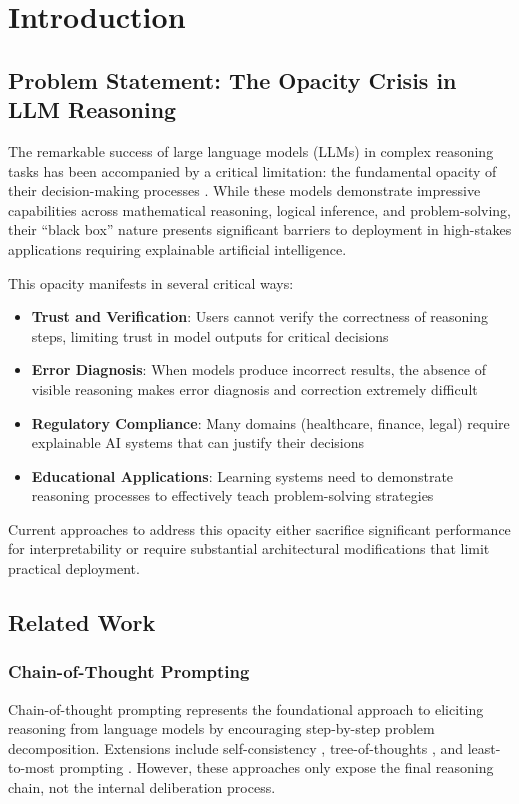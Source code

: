 \section{Introduction}
\label{sec:introduction}

\subsection{Problem Statement: The Opacity Crisis in LLM Reasoning}

The remarkable success of large language models (LLMs) in complex reasoning tasks has been accompanied by a critical limitation: the fundamental opacity of their decision-making processes \cite{brown2020language,openai2023gpt4}. While these models demonstrate impressive capabilities across mathematical reasoning, logical inference, and problem-solving, their ``black box'' nature presents significant barriers to deployment in high-stakes applications requiring explainable artificial intelligence.

This opacity manifests in several critical ways:
\begin{itemize}
    \item \textbf{Trust and Verification}: Users cannot verify the correctness of reasoning steps, limiting trust in model outputs for critical decisions
    \item \textbf{Error Diagnosis}: When models produce incorrect results, the absence of visible reasoning makes error diagnosis and correction extremely difficult
    \item \textbf{Regulatory Compliance}: Many domains (healthcare, finance, legal) require explainable AI systems that can justify their decisions
    \item \textbf{Educational Applications}: Learning systems need to demonstrate reasoning processes to effectively teach problem-solving strategies
\end{itemize}

Current approaches to address this opacity either sacrifice significant performance for interpretability or require substantial architectural modifications that limit practical deployment.

\subsection{Related Work}

\subsubsection{Chain-of-Thought Prompting}
Chain-of-thought prompting \cite{wei2022chain} represents the foundational approach to eliciting reasoning from language models by encouraging step-by-step problem decomposition. Extensions include self-consistency \cite{wang2022self}, tree-of-thoughts \cite{yao2023tree}, and least-to-most prompting \cite{zhou2022least}. However, these approaches only expose the final reasoning chain, not the internal deliberation process.

